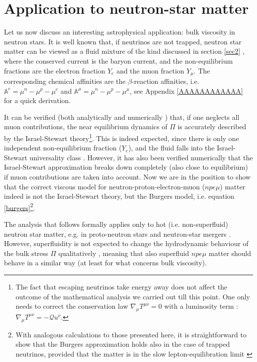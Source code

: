 \documentclass[a4paper, amsfonts, amssymb, amsmath, reprint, showkeys, nofootinbib, twoside, onecolumn,notitlepage]{revtex4-1}
\begin{document}
\section{Application to neutron-star matter}

Let us now discuss an interesting astrophysical application: bulk viscosity in neutron stars. It is well known that, if neutrinos are not trapped, neutron star matter can be viewed as a fluid mixture of the kind discussed in section \ref{sec2} \cite{Camelio2022,CamelioSimulations2022}, where the conserved current is the baryon current, and the non-equilibrium fractions are the electron fraction $Y_e$ and the muon fraction $Y_\mu$. The corresponding chemical affinities are the $\beta$-reaction affinities, i.e. $\mathbb{A}^e=\mu^n-\mu^p-\mu^e$ and $\mathbb{A}^\mu=\mu^n-\mu^p-\mu^\mu$, see Appendix \ref{AAAAAAAAAAAA} for a quick derivation.

It can be verified (both analytically \cite{BulkGavassino,GavassinoFarFromBulk2023} and numerically \cite{CamelioSimulations2022}) that, if one neglects all muon contributions, the near equilibrium dynamics of $\Pi$ is accurately described by the Israel-Stewart theory\footnote{The fact that escaping neutrinos take energy away does not affect the outcome of the mathematical analysis we carried out till this point. One only needs to correct the conservation law $\nabla_\mu T^{\mu \nu}=0$ with a luminosity term \cite{Camelio2022}: $\nabla_\mu T^{\mu \nu}=-\mathcal{Q}u^\nu$.}. This is indeed expected, since there is only one independent non-equilibrium fraction ($Y_e$), and the fluid falls into the Israel-Stewart universality class \cite{GavassinoUniversalityII2023}.  However, it has also been verified numerically \cite{CamelioSimulations2022} that the Israel-Stewart approximation breaks down completely (also close to equilibrium) if muon contributions are taken into account. Now we are in the position to show that the correct viscous model for neutron-proton-electron-muon ($npe\mu$) matter indeed is not the Israel-Stewart theory, but the Burgers model, i.e. equation \eqref{burgers}\footnote{With analogous calculations to those presented here, it is straightforward to show that the Burgers approximation holds also in the case
of trapped neutrinos, provided that the matter is in the slow lepton-equilibration limit \cite{AlfordMuons2021,AlfordMuons2022}}. 

The analysis that follows formally applies only to hot (i.e. non-superfluid) neutron star matter, e.g. in proto-neutron stars and neutron-star mergers \cite{AlfordMuons2021}. However, superfluidity is not expected to change the hydrodynamic behaviour of the bulk stress $\Pi$ qualitatively \cite{Gusakov2007,GavassinoKhalatnikov2022}, meaning that also superfluid $npe\mu$ matter should behave in a similar way (at least for what concerns bulk viscosity).
\end{document}
